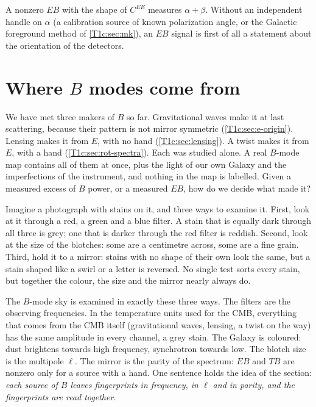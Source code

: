\begin{pitfall}
A nonzero $EB$ with the shape of $C^{EE}$ measures $\alpha+\beta$. Without an independent handle on $\alpha$ (a calibration source of known polarization angle, or the Galactic foreground method of \cref{T1c:sec:mk}), an $EB$ signal is first of all a statement about the orientation of the detectors.
\end{pitfall}
\section{Where \texorpdfstring{$B$}{B} modes come from}
\label{T1c:sec:sources}

We have met three makers of $B$ so far. Gravitational waves make it at last scattering, because their pattern is not mirror symmetric (\cref{T1c:sec:e-origin}). Lensing makes it from $E$, with no hand (\cref{T1c:sec:lensing}). A twist makes it from $E$, with a hand (\cref{T1c:sec:rot-spectra}). Each was studied alone. A real $B$-mode map contains all of them at once, plus the light of our own Galaxy and the imperfections of the instrument, and nothing in the map is labelled. Given a measured excess of $B$ power, or a measured $EB$, how do we decide what made it?

Imagine a photograph with stains on it, and three ways to examine it. First, look at it through a red, a green and a blue filter. A stain that is equally dark through all three is grey; one that is darker through the red filter is reddish. Second, look at the size of the blotches: some are a centimetre across, some are a fine grain. Third, hold it to a mirror: stains with no shape of their own look the same, but a stain shaped like a swirl or a letter is reversed. No single test sorts every stain, but together the colour, the size and the mirror nearly always do.

The $B$-mode sky is examined in exactly these three ways. The filters are the observing frequencies. In the temperature units used for the CMB, everything that comes from the CMB itself (gravitational waves, lensing, a twist on the way) has the same amplitude in every channel, a grey stain. The Galaxy is coloured: dust brightens towards high frequency, synchrotron towards low. The blotch size is the multipole $\ell$. The mirror is the parity of the spectrum: $EB$ and $TB$ are nonzero only for a source with a hand. One sentence holds the idea of the section: \emph{each source of $B$ leaves fingerprints in frequency, in $\ell$ and in parity, and the fingerprints are read together.}

